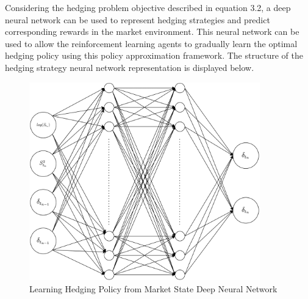Considering the hedging problem objective described in equation 3.2, a deep neural network can be used to represent hedging strategies and predict corresponding rewards in the market environment. This neural network can be used to allow the reinforcement learning agents to gradually learn the optimal hedging policy using this policy approximation framework. The structure of the hedging strategy neural network representation is displayed below.
\begin{figure}[h]
\centering
\includegraphics[width=10cm]{templates/assets/drl/dnn.png}
\caption{Learning Hedging Policy from Market State Deep Neural Network}
\end{figure}

